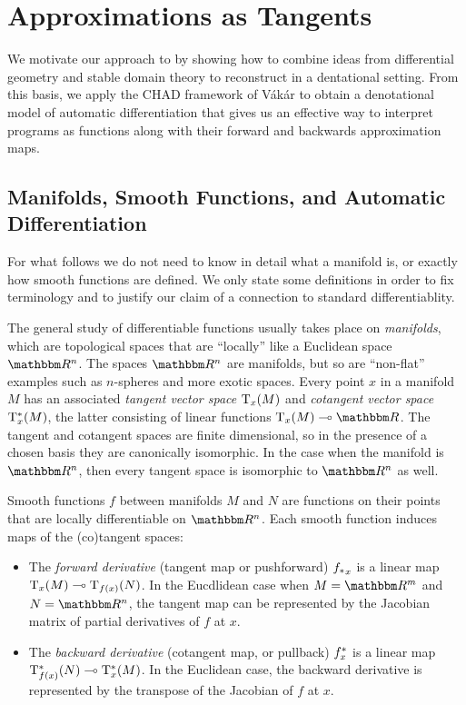 \section{Approximations as Tangents}

We motivate our approach to \GPS by showing how to combine ideas from differential geometry and stable domain theory to reconstruct \GPS in a dentational setting. From this basis, we apply the CHAD framework of V{\'a}k{\'a}r \etal to obtain a denotational model of automatic differentiation that gives us an effective way to interpret programs as functions along with their forward and backwards approximation maps.

\subsection{Manifolds, Smooth Functions, and Automatic Differentiation}

For what follows we do not need to know in detail what a manifold is, or exactly how smooth functions are defined. We only state some definitions in order to fix terminology and to justify our claim of a connection to standard differentiablity. 

The general study of differentiable functions usually takes place on \emph{manifolds}, which are topological spaces that are ``locally'' like a Euclidean space $\RR^n$. The spaces $\RR^n$ are manifolds, but so are ``non-flat'' examples such as $n$-spheres and more exotic spaces. Every point $x$ in a manifold $M$ has an associated \emph{tangent vector space} $\mathrm{T}_x(M)$ and \emph{cotangent vector space} $\mathrm{T}^*_x(M)$, the latter consisting of linear functions $\tangents_x(M) \linearto \RR$. The tangent and cotangent spaces are finite dimensional, so in the presence of a chosen basis they are canonically isomorphic. In the case when the manifold is $\RR^n$, then every tangent space is isomorphic to $\RR^n$ as well.

Smooth functions $f$ between manifolds $M$ and $N$ are functions on their points that are locally differentiable on $\RR^n$. Each smooth function induces maps of the (co)tangent spaces:
\begin{itemize}
\item The \emph{forward derivative} (tangent map or pushforward) ${f_{*}}_x$ is a linear map $\mathrm{T}_x(M) \multimap \mathrm{T}_{f(x)}(N)$. In the Eucdlidean case when $M = \RR^m$ and $N = \RR^n$, the tangent map can be represented by the Jacobian matrix of partial derivatives of $f$ at $x$.
\item The \emph{backward derivative} (cotangent map, or pullback) $f^{*}_x$ is a linear map $\mathrm{T}^*_{f(x)}(N) \multimap \mathrm{T}^*_x(M)$. In the Euclidean case, the backward derivative is represented by the transpose of the Jacobian of $f$ at $x$.
\end{itemize}

